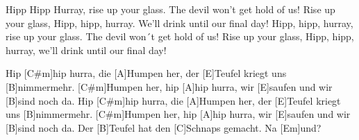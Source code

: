 \begin{guitar}
	Hipp Hipp Hurray, rise up your glass. The devil won't get hold of us!
	Rise up your glass, Hipp, hipp, hurray. We'll drink until our final day!
	Hipp, hipp, hurray, rise up your glass. The devil won´t get hold of us!
	Rise up your glass, Hipp, hipp, hurray, we'll drink until our final day!
	
	Hip [C#m]hip hurra, die [A]Humpen her, der [E]Teufel kriegt uns [B]nimmermehr.
	[C#m]Humpen her, hip [A]hip hurra, wir [E]saufen und wir [B]sind noch da.
	Hip [C#m]hip hurra, die [A]Humpen her, der [E]Teufel kriegt uns [B]nimmermehr.
	[C#m]Humpen her, hip [A]hip hurra, wir [E]saufen und wir [B]sind noch da.
	Der [B]Teufel hat den [C]Schnaps gemacht. Na [Em]und?
	
	
\end{guitar}